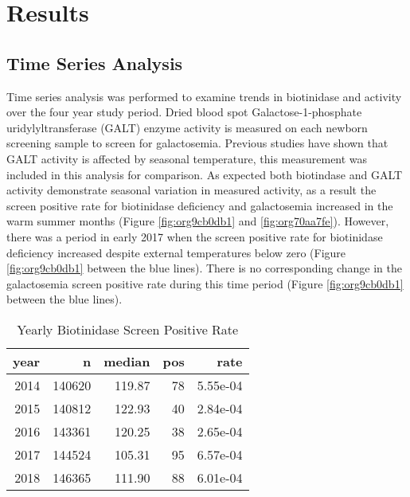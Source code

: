 \documentclass[review]{elsarticle}
\begin{document}
\section*{Results}
\label{sec:org074b08c}
\subsection*{Time Series Analysis}
\label{sec:org86dbd4e}
Time series analysis was performed to examine trends in biotinidase
and activity over the four year study period. Dried blood spot
Galactose-1-phosphate uridylyltransferase (GALT) enzyme activity is
measured on each newborn screening sample to screen for
galactosemia. Previous studies have shown that GALT activity is
affected by seasonal temperature, this measurement was included in
this analysis for comparison. As expected both biotindase and GALT
activity demonstrate seasonal variation in measured activity, as a
result the screen positive rate for biotinidase deficiency and
galactosemia increased in the warm summer months (Figure \ref{fig:org9cb0db1}
and \ref{fig:org70aa7fe}). However, there was a period in early 2017 when the
screen positive rate for biotinidase deficiency increased despite
external temperatures below zero (Figure \ref{fig:org9cb0db1} between the blue
lines). There is no corresponding change in the galactosemia screen
positive rate during this time period (Figure \ref{fig:org9cb0db1} between the
blue lines).

\begin{table}[ht]
\centering
\begin{tabular}{rrrrr}
  \hline
year & n & median & pos & rate \\ 
  \hline
2014 & 140620 & 119.87 &  78 & 5.55e-04 \\ 
  2015 & 140812 & 122.93 &  40 & 2.84e-04 \\ 
  2016 & 143361 & 120.25 &  38 & 2.65e-04 \\ 
  2017 & 144524 & 105.31 &  95 & 6.57e-04 \\ 
  2018 & 146365 & 111.90 &  88 & 6.01e-04 \\ 
   \hline
\end{tabular}
\caption{Yearly Biotinidase Screen Positive Rate} 
\label{tab:biot_year}
\end{table}
\end{document}

